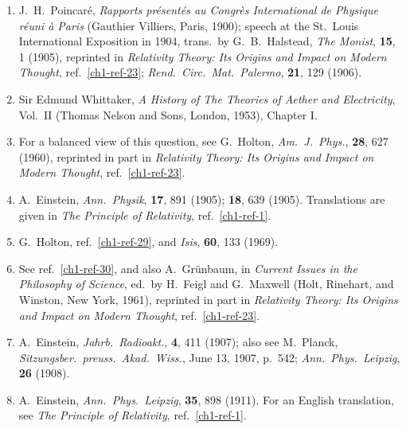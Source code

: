 \begin{enumerate}
  \item {}\label{ch1-ref-27}
  J.\ H.\ Poincar\'e, \emph{Rapports pr\'esent\'es au Congr\`es
  International de Physique r\'euni \`a Paris} (Gauthier Villiers, Paris,
  1900); speech at the St.\ Louis International Exposition in 1904, trans.\
  by G.\ B.\ Halstead, \emph{The Monist}, \textbf{15}, 1 (1905), reprinted
  in \emph{Relativity Theory: Its Origins and Impact on Modern Thought},
  ref.~\ref{ch1-ref-23}; \emph{Rend.\ Circ.\ Mat.\ Palermo}, \textbf{21}, 129
  (1906).

  \item {}\label{ch1-ref-28}
  Sir Edmund Whittaker, \emph{A History of The Theories of Aether and
  Electricity}, Vol.\ II (Thomas Nelson and Sons, London, 1953), Chapter I.

  \item {}\label{ch1-ref-29}
  For a balanced view of this question, see G.\ Holton, \emph{Am.\ J.\
  Phys.}, \textbf{28}, 627 (1960), reprinted in part in \emph{Relativity
  Theory: Its Origins and Impact on Modern Thought}, ref.~\ref{ch1-ref-23}.

  \item \phantomsection\label{ch1-ref-30}
  A.\ Einstein, \emph{Ann.\ Physik}, \textbf{17}, 891 (1905); \textbf{18},
  639 (1905). Translations are given in \emph{The Principle of Relativity},
  ref.~\ref{ch1-ref-1}.

  \item {}\label{ch1-ref-31}
  G.\ Holton, ref.~\ref{ch1-ref-29}, and \emph{Isis}, \textbf{60}, 133
  (1969).

  \item {}\label{ch1-ref-32}
  See ref.~\ref{ch1-ref-30}, and also A.\ Gr\"unbaum, in \emph{Current Issues
  in the Philosophy of Science}, ed.\ by H.\ Feigl and G.\ Maxwell (Holt,
  Rinehart, and Winston, New York, 1961), reprinted in part in
  \emph{Relativity Theory: Its Origins and Impact on Modern Thought},
  ref.~\ref{ch1-ref-23}.

  \item {}\label{ch1-ref-33}
  A.\ Einstein, \emph{Jahrb.\ Radioakt.}, \textbf{4}, 411 (1907); also see
  M.\ Planck, \emph{Sitzungsber.\ preuss.\ Akad.\ Wiss.}, June 13, 1907,
  p.\ 542; \emph{Ann.\ Phys.\ Leipzig}, \textbf{26} (1908).

  \item {}\label{ch1-ref-34}
  A.\ Einstein, \emph{Ann.\ Phys.\ Leipzig}, \textbf{35}, 898 (1911). For an
  English translation, see \emph{The Principle of Relativity},
  ref.~\ref{ch1-ref-1}.


\end{enumerate}
